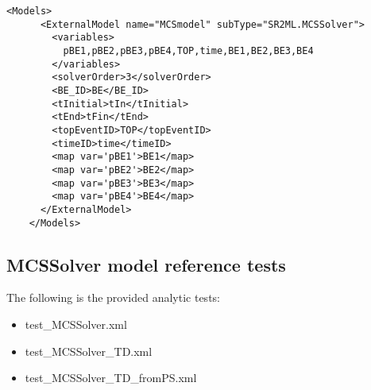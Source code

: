 \begin{itemize}
   \begin{lstlisting}[style=XML,morekeywords={anAttribute},caption=Time dependent (from PointSet) MCSSolver model input example., label=lst:MCSSolver_InputExample]
    <Models>
      <ExternalModel name="MCSmodel" subType="SR2ML.MCSSolver">
        <variables>
          pBE1,pBE2,pBE3,pBE4,TOP,time,BE1,BE2,BE3,BE4
        </variables>
        <solverOrder>3</solverOrder>
        <BE_ID>BE</BE_ID>
        <tInitial>tIn</tInitial>
        <tEnd>tFin</tEnd>
        <topEventID>TOP</topEventID>
        <timeID>time</timeID>
        <map var='pBE1'>BE1</map>
        <map var='pBE2'>BE2</map>
        <map var='pBE3'>BE3</map>
        <map var='pBE4'>BE4</map>
      </ExternalModel>
    </Models>
  \end{lstlisting}
\end{itemize}

\subsection{MCSSolver model reference tests}
The following is the provided analytic tests:
\begin{itemize}
  \item test\_MCSSolver.xml
  \item test\_MCSSolver\_TD.xml
  \item test\_MCSSolver\_TD\_fromPS.xml
\end{itemize}
